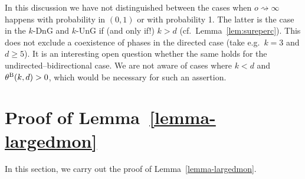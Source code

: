 \documentclass{article}
\theoremstyle{definition}
\newcommand{\1}{\mathbbm{1}}
\newcommand{\0}{\mathbf{o}}
\begin{document}
In this discussion we have not distinguished between the cases when $o \rightsquigarrow \infty$ happens with probability in $(0,1)$ or with probability 1. The latter is the case in the $k$-DnG and $k$-UnG if (and only if!) $k>d$ (cf.\ Lemma~\ref{lem:sureperc}). This does not exclude a coexistence of phases in the directed case (take e.g.\ $k=3$ and $d \geq 5$). It is an interesting open question whether the same holds for the undirected--bidirectional case. We are not aware of cases where $k<d$ and $\theta^{\rm B}(k,d)>0$, which would be necessary for such an assertion.

\appendix

\section{Proof of Lemma~\ref{lemma-largedmon}}\label{sec:largedmon}
In this section, we carry out the proof of Lemma~\ref{lemma-largedmon}.
\end{document}
